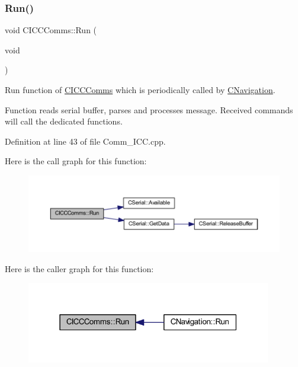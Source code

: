 \subsubsection{\texorpdfstring{Run()}{Run()}}
{\footnotesize\ttfamily void C\+I\+C\+C\+Comms\+::\+Run (\begin{DoxyParamCaption}\item[{void}]{ }\end{DoxyParamCaption})\hspace{0.3cm}{\ttfamily [virtual]}}



Run function of \mbox{\hyperlink{class_c_i_c_c_comms}{C\+I\+C\+C\+Comms}} which is periodically called by \mbox{\hyperlink{class_c_navigation}{C\+Navigation}}. 

Function reads serial buffer, parses and processes message. Received commands will call the dedicated functions. 

Definition at line 43 of file Comm\+\_\+\+I\+C\+C.\+cpp.

Here is the call graph for this function\+:\nopagebreak
\begin{figure}[H]
\begin{center}
\leavevmode
\includegraphics[width=350pt]{class_c_i_c_c_comms_a8b3fa81307b3b9ba0e72b4aee8279c56_cgraph}
\end{center}
\end{figure}
Here is the caller graph for this function\+:\nopagebreak
\begin{figure}[H]
\begin{center}
\leavevmode
\includegraphics[width=303pt]{class_c_i_c_c_comms_a8b3fa81307b3b9ba0e72b4aee8279c56_icgraph}
\end{center}
\end{figure}


